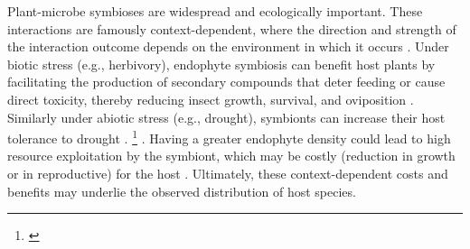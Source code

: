 \documentclass[11pt]{article}
\newcommand{\jacob}[2]{{\color{blue}{#1}}\footnote{\textit{\color{blue}{#2}}}}
\begin{document}
Plant-microbe symbioses are widespread and ecologically important. 
These interactions are famously context-dependent, where the direction and strength of the interaction outcome depends on the environment in which it occurs \citep{fowler2023geographic,hoeksema2015context, bronstein1994conditional}.
Under biotic stress (e.g., herbivory), endophyte symbiosis can benefit host plants by facilitating the production of secondary compounds that deter feeding or cause direct toxicity, thereby reducing insect growth, survival, and oviposition \citep{atala2022fungal,bastias2017epichloe,vega2008insect}.
Similarly under abiotic stress (e.g., drought), symbionts can increase their host tolerance to drought \citep{clay2002evolutionary}.
\jacob{However, in many plant-microbe interactions, host protection is not guaranteed solely by the presence of a symbionts; rather, the density of the symbiont can determine the effectiveness of this protection}{I am not sure if we'll use the density data from Julia summer project.} \citep{laughton2014combined}. 
Having a greater endophyte density could lead to high resource exploitation by the symbiont, which may be costly (reduction in  growth  or in reproductive) for the host \citep{faeth2009asexual}.
Ultimately, these context-dependent costs and benefits may underlie the observed distribution of host species.
\end{document}
